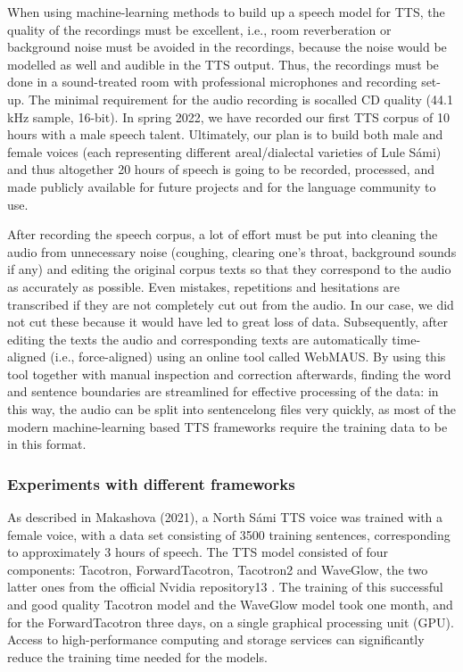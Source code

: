 \documentclass[free]{flammie}
\begin{document}
When using machine-learning methods to build up a speech model for TTS, the quality
of the recordings must be excellent, i.e., room reverberation or background noise must be
avoided in the recordings, because the noise would be modelled as well and audible in the
TTS output. Thus, the recordings must be done in a sound-treated room with professional
microphones and recording set-up. The minimal requirement for the audio recording is socalled CD quality (44.1 kHz sample, 16-bit). In spring 2022, we have recorded our first
TTS corpus of 10 hours with a male speech talent. Ultimately, our plan is to build both
male and female voices (each representing different areal/dialectal varieties of Lule Sámi)
and thus altogether 20 hours of speech is going to be recorded, processed, and made publicly available for future projects and for the language community to use.

After recording the speech corpus, a lot of effort must be put into cleaning the audio
from unnecessary noise (coughing, clearing one’s throat, background sounds if any) and
editing the original corpus texts so that they correspond to the audio as accurately as possible. Even mistakes, repetitions and hesitations are transcribed if they are not completely
cut out from the audio. In our case, we did not cut these because it would have led to great
loss of data. Subsequently, after editing the texts the audio and corresponding texts are
automatically time-aligned (i.e., force-aligned) using an online tool called WebMAUS. By using this tool together with manual
inspection and correction afterwards, finding the word and sentence boundaries are streamlined for effective processing of the data: in this way, the audio can be split into sentencelong files very quickly, as most of the modern machine-learning based TTS frameworks
require the training data to be in this format.

\subsubsection{Experiments with different frameworks}

As described in Makashova (2021), a North Sámi TTS voice was trained with a female
voice, with a data set consisting of 3500 training sentences, corresponding to approximately
3 hours of speech. The TTS model consisted of four components: Tacotron, ForwardTacotron, Tacotron2 and WaveGlow, the two latter ones from the official Nvidia repository13
. The training of this successful and good quality Tacotron model and the WaveGlow
model took one month, and for the ForwardTacotron three days, on a single graphical processing unit (GPU). Access to high-performance computing and storage services can significantly reduce the training time needed for the models.
\end{document}
